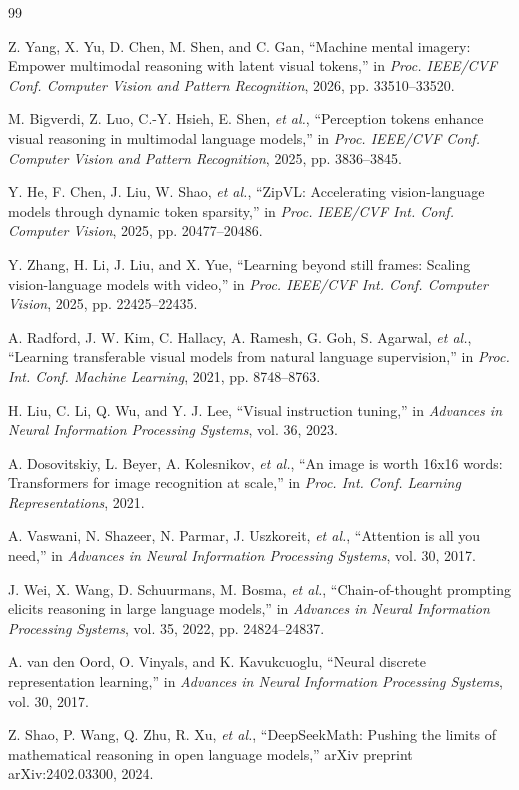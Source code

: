 \documentclass[12pt,a4paper,final]{extreport}
\begin{document}
\begin{thebibliography}{99}

Z. Yang, X. Yu, D. Chen, M. Shen, and C. Gan, ``Machine mental imagery: Empower multimodal reasoning with latent visual tokens,'' in \textit{Proc. IEEE/CVF Conf. Computer Vision and Pattern Recognition}, 2026, pp. 33510--33520.

M. Bigverdi, Z. Luo, C.-Y. Hsieh, E. Shen, \textit{et al.}, ``Perception tokens enhance visual reasoning in multimodal language models,'' in \textit{Proc. IEEE/CVF Conf. Computer Vision and Pattern Recognition}, 2025, pp. 3836--3845.

Y. He, F. Chen, J. Liu, W. Shao, \textit{et al.}, ``ZipVL: Accelerating vision-language models through dynamic token sparsity,'' in \textit{Proc. IEEE/CVF Int. Conf. Computer Vision}, 2025, pp. 20477--20486.

Y. Zhang, H. Li, J. Liu, and X. Yue, ``Learning beyond still frames: Scaling vision-language models with video,'' in \textit{Proc. IEEE/CVF Int. Conf. Computer Vision}, 2025, pp. 22425--22435.

A. Radford, J. W. Kim, C. Hallacy, A. Ramesh, G. Goh, S. Agarwal, \textit{et al.}, ``Learning transferable visual models from natural language supervision,'' in \textit{Proc. Int. Conf. Machine Learning}, 2021, pp. 8748--8763.

H. Liu, C. Li, Q. Wu, and Y. J. Lee, ``Visual instruction tuning,'' in \textit{Advances in Neural Information Processing Systems}, vol. 36, 2023.

A. Dosovitskiy, L. Beyer, A. Kolesnikov, \textit{et al.}, ``An image is worth 16x16 words: Transformers for image recognition at scale,'' in \textit{Proc. Int. Conf. Learning Representations}, 2021.

A. Vaswani, N. Shazeer, N. Parmar, J. Uszkoreit, \textit{et al.}, ``Attention is all you need,'' in \textit{Advances in Neural Information Processing Systems}, vol. 30, 2017.

J. Wei, X. Wang, D. Schuurmans, M. Bosma, \textit{et al.}, ``Chain-of-thought prompting elicits reasoning in large language models,'' in \textit{Advances in Neural Information Processing Systems}, vol. 35, 2022, pp. 24824--24837.

A. van den Oord, O. Vinyals, and K. Kavukcuoglu, ``Neural discrete representation learning,'' in \textit{Advances in Neural Information Processing Systems}, vol. 30, 2017.

Z. Shao, P. Wang, Q. Zhu, R. Xu, \textit{et al.}, ``DeepSeekMath: Pushing the limits of mathematical reasoning in open language models,'' arXiv preprint arXiv:2402.03300, 2024.

\end{thebibliography}
\endgroup
\end{document}
